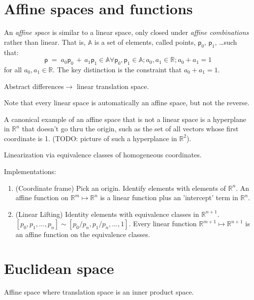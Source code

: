\section{\label{sec:Affine} Affine spaces and functions}

An \textit{affine space} is similar to a linear space, only
closed under \textit{affine combinations} rather than linear.
That is,
\(\mathbb{A}\) is a set of elements, called points,
\(\mathsf{p}_0\), \(\mathsf{p}_1\), \ldots such that:
\begin{equation}
\mathsf{p} \; = \; a_0 \mathsf{p}_0 \, + \, a_1 \mathsf{p}_1 
\in \mathbb{A} \forall \mathsf{p}_0, \mathsf{p}_1 \in
\mathbb{A}; a_0, a_1 \in \mathbb{R}; a_0 + a_1 = 1
\end{equation}
for all \(a_0, a_1 \in \mathbb{R}\).
The key distinction is the constraint that \(a_0 + a_1 = 1\).

Abstract differences\(\rightarrow\) linear translation space.

Note that every linear space is automatically an affine space,
but not the reverse.

A canonical example of an affine space that is not a linear
space is a hyperplane in \(\mathbb{R}^n\) that doesn't go thru
the origin, such as the set of all vectors whose first
coordinate is 1. (TODO: picture of such a hyperplance in
\(\mathbb{R}^2\)).

Linearization via equivalence classes of homogeneous
coordinates.

Implementations:
\begin{enumerate}
  \item (Coordinate frame) Pick an origin. Identify elements
  with elements of \( \mathbb{R}^n \). An affine function on 
  \( \mathbb{R}^{m} \mapsto \mathbb{R}^n \) is a linear
  function plus an 'intercept' term in \( \mathbb{R}^n \).
  \item (Linear Lifting) Identity elements with equivalence
  classes in \( \mathbb{R}^{n+1} \). 
  \( [p_0, p_1, \ldots, p_n] \sim [p_0/p_n, p_1/p_n, \ldots, 1]
  \). Every linear function \(\mathbb{R}^{m+1} \mapsto
  \mathbb{R}^{n+1} \) is an affine function on the equivalence classes.
\end{enumerate}

\section{Euclidean space}

 Affine space where translation space is an inner product space.
 
